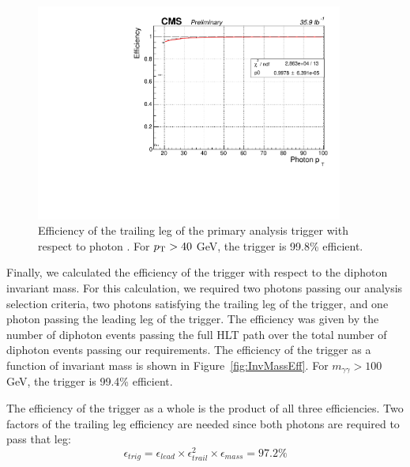 \begin{figure}[h]
\begin{center}
\includegraphics[width=0.9\textwidth]{Figures/Trigger/trailingEff.pdf}
\end{center}
\caption[Efficiency of the trailing leg of the primary analysis trigger with respect to photon \pT.]
{Efficiency of the trailing leg of the primary analysis trigger with respect to photon \pT. 
For $p_{\mathrm{T}} > 40$ GeV, the trigger is 99.8\% efficient.}
\label{fig:trailEff}
\end{figure}

Finally, we calculated the efficiency of the trigger with respect to the diphoton invariant mass. For this calculation, we required two photons passing our analysis selection criteria, two photons satisfying the trailing leg of the trigger, and one photon passing the leading leg of the trigger. The efficiency was given by the number of diphoton events passing the full HLT path over the total number of diphoton events passing our requirements. The efficiency of the trigger as a function of invariant mass is shown in Figure~\ref{fig:InvMassEff}. For $m_{\gamma\gamma} > 100$ GeV, the trigger is 99.4\% efficient.

The efficiency of the trigger as a whole is the product of all three efficiencies. Two factors of the trailing leg efficiency are needed since both photons are required to pass that leg:
\begin{equation}
 \epsilon_{trig} = \epsilon_{lead} \times \epsilon_{trail}^2 \times \epsilon_{mass} = 97.2\%
\end{equation}

